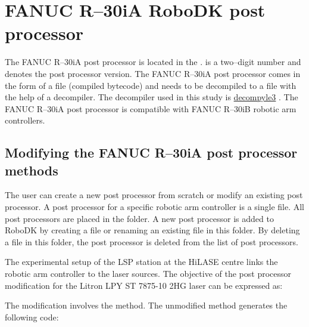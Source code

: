 \section{FANUC R--30iA RoboDK post processor}

The FANUC R--30iA post processor is located in the .  is a two--digit number and denotes the post processor version. The FANUC R--30iA post processor comes in the form of a  file (compiled bytecode) and needs to be decompiled to a  file with the help of a decompiler. The decompiler used in this study is   \href{https://github.com/rocky/python--decompile3}{decompyle3} \cite{decompyle3}. The FANUC R--30iA post processor is compatible with FANUC R--30iB robotic arm controllers.

\subsection{Modifying the FANUC R--30iA post processor methods} 
\label{sec:modifying}

The user can create a new post processor from scratch or modify an existing post processor. A post processor for a specific robotic arm controller is a single  file. All post processors are placed in the  folder. A new post processor is added to RoboDK by creating a  file or renaming an existing  file in this folder. By deleting a  file in this folder, the post processor is deleted from the list of post processors. 

The experimental setup of the LSP station at the HiLASE centre links the robotic arm controller to the laser sources. The objective of the post processor modification for the Litron LPY ST 7875-10 2HG laser can be expressed as:



The modification involves the  method. The unmodified  method generates the following code:


